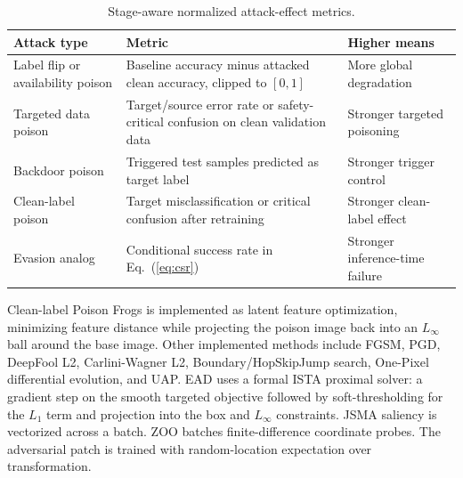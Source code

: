\documentclass[conference]{IEEEtran}
\begin{document}
\begin{table}[t]
\centering
\caption{Stage-aware normalized attack-effect metrics.}
\label{tab:metrics}
\small
\begin{tabular}{p{}p{}p{}}
\toprule
Attack type & Metric & Higher means \\
\midrule
Label flip or availability poison & Baseline accuracy minus attacked clean accuracy, clipped to \([0,1]\) & More global degradation \\
Targeted data poison & Target/source error rate or safety-critical confusion on clean validation data & Stronger targeted poisoning \\
Backdoor poison & Triggered test samples predicted as target label & Stronger trigger control \\
Clean-label poison & Target misclassification or critical confusion after retraining & Stronger clean-label effect \\
Evasion analog & Conditional success rate in Eq.~(\ref{eq:csr}) & Stronger inference-time failure \\
\bottomrule
\end{tabular}
\end{table}

 Clean-label Poison Frogs is implemented as latent feature optimization, minimizing feature distance while projecting the poison image back into an \(L_\infty\) ball around the base image. Other implemented methods include FGSM, PGD, DeepFool L2, Carlini-Wagner L2, Boundary/HopSkipJump search, One-Pixel differential evolution, and UAP. EAD uses a formal ISTA proximal solver: a gradient step on the smooth targeted objective followed by soft-thresholding for the \(L_1\) term and projection into the box and \(L_\infty\) constraints. JSMA saliency is vectorized across a batch. ZOO batches finite-difference coordinate probes. The adversarial patch is trained with random-location expectation over transformation.
\end{document}
